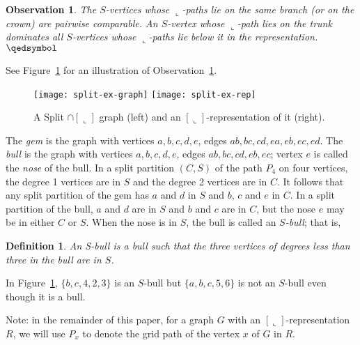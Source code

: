 \documentclass[11pt,3p,times]{elsarticle}
\newcommand{\La}{\ensuremath{\llcorner}} \newcommand{\Lb}{\ensuremath{\ulcorner}} \newcommand{\Lc}{\ensuremath{\lrcorner}} \newcommand{\Ld}{\ensuremath{\urcorner}}
\newcommand{\proofBox}{\hfill $\qedsymbol$}
\newtheorem{observation}[theorem]{Observation}
\newtheorem{definition}{Definition}
\begin{document}
\begin{observation}\label{obs:comparable}
The $S$-vertices whose $\La$-paths lie on the same branch (or
on the crown) are pairwise comparable. An $S$-vertex whose $\La$-path lies
on the trunk dominates all $S$-vertices whose $\La$-paths lie below it
in the representation. \proofBox
\end{observation}
See Figure~\ref{fig:L-representation} for an illustration of
Observation~\ref{obs:comparable}.
\begin{figure}[h]
\hfill
\texttt{[image: split-ex-graph]}
\hfill
\texttt{[image: split-ex-rep]}
\hfill \ \caption{A Split $\cap [\La]$ graph (left) and an
$[\La]$-representation of it (right).}\label{fig:L-representation}
\end{figure}


The {\em gem} is the graph with vertices $a,b,c,d,e$, edges
$ab,bc,cd,ea,eb,ec,ed$. The {\em bull} is the graph with vertices
$a,b,c,d,e$, edges $ab,bc,cd,eb,ec$; vertex $e$ is called the {\em nose}
of the bull.  In a split partition $(C,S)$ of the path $P_4$ on four
vertices, the degree 1 vertices are in $S$ and the degree 2 vertices
are in $C$. It follows that any split partition of the gem has $a$ and $d$
in $S$ and $b$, $c$ and $e$ in $C$.  In a split partition of the bull,
$a$ and $d$ are in $S$ and $b$ and $c$ are in $C$, but the
nose $e$ may be in either $C$ or $S$. When the nose is in $S$, the
bull is called an {\em $S$-bull}; that is,

\begin{definition}\label{def:S-bull}
An {\em S-bull} is a bull such that the three vertices of degrees
less than three in the bull are in $S$.
\end{definition}
In Figure~\ref{fig:L-representation}, $\{b,c,4,2,3\}$ is an
$S$-bull but $\{a,b,c,5,6\}$ is not an $S$-bull even though it is
a bull. 

Note: in the remainder of this paper, for a graph $G$ with an 
$[\La]$-representation $R$, we will use $P_x$ to denote the grid path of 
the vertex $x$ of $G$ in $R$.
\end{document}
